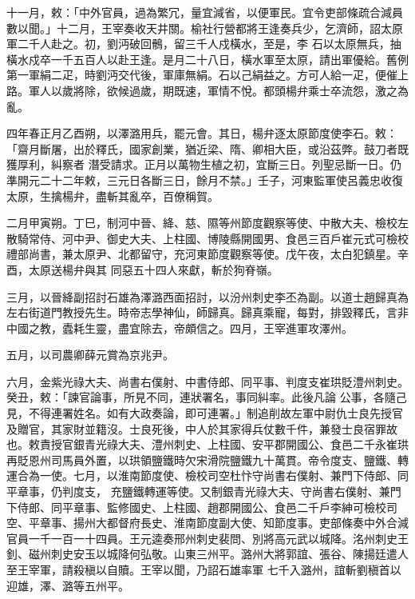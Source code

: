\begin{pinyinscope}
 十一月，敕：「中外官員，過為繁冗，量宜減省，以便軍民。宜令吏部條疏合減員數以聞。」十二月，王宰奏收天井關。榆社行營都將王逢奏兵少，乞濟師，詔太原軍二千人赴之。初，劉沔破回鶻，留三千人戍橫水，至是，李
 石以太原無兵，抽橫水戍卒一千五百人以赴王逢。是月二十八日，橫水軍至太原，請出軍優給。舊例第一軍絹二疋，時劉沔交代後，軍庫無絹。石以己絹益之。方可人給一疋，便催上路。軍人以歲將除，欲候過歲，期既速，軍情不悅。都頭楊弁乘士卒流怨，激之為亂。



 四年春正月乙酉朔，以澤潞用兵，罷元會。其日，楊弁逐太原節度使李石。敕：「齋月斷屠，出於釋氏，國家創業，猶近梁、隋、卿相大臣，或沿茲弊。鼓刀者既獲厚利，糾察者
 潛受請求。正月以萬物生植之初，宜斷三日。列聖忌斷一日。仍準開元二十二年敕，三元日各斷三日，餘月不禁。」壬子，河東監軍使呂義忠收復太原，生擒楊弁，盡斬其亂卒，百僚稱賀。



 二月甲寅朔。丁巳，制河中晉、絳、慈、隰等州節度觀察等使、中散大夫、檢校左散騎常侍、河中尹、御史大夫、上柱國、博陵縣開國男、食邑三百戶崔元式可檢校禮部尚書，兼太原尹、北都留守，充河東節度觀察等使。戊午夜，太白犯鎮星。辛酉，太原送楊弁與其
 同惡五十四人來獻，斬於狗脊嶺。



 三月，以晉絳副招討石雄為澤潞西面招討，以汾州刺史李丕為副。以道士趙歸真為左右街道門教授先生。時帝志學神仙，師歸真。歸真乘寵，每對，排毀釋氏，言非中國之教，蠹耗生靈，盡宜除去，帝頗信之。四月，王宰進軍攻澤州。



 五月，以司農卿薛元賞為京兆尹。



 六月，金紫光祿大夫、尚書右僕射、中書侍郎、同平事、判度支崔珙貶澧州刺史。癸丑，敕：「諫官論事，所見不同，連狀署名，事同糾率。此後凡論
 公事，各隨己見，不得連署姓名。如有大政奏論，即可連署。」制追削故左軍中尉仇士良先授官及贈官，其家財並籍沒。士良死後，中人於其家得兵仗數千件，兼發士良宿罪故也。敕責授官銀青光祿大夫、澧州刺史、上柱國、安平郡開國公、食邑二千永崔珙再貶恩州司馬員外置，以珙領鹽鐵時欠宋滑院鹽鐵九十萬貫。帝令度支、鹽鐵、轉運合為一使。七月，以淮南節度使、檢校司空杜忭守尚書右僕射、兼門下侍郎、同平章事，仍判度支，
 充鹽鐵轉運等使。又制銀青光祿大夫、守尚書右僕射、兼門下侍郎、同平章事、監修國史、上柱國、趙郡開國公、食邑二千戶李紳可檢校司空、平章事、揚州大都督府長史、淮南節度副大使、知節度事。吏部條奏中外合減官員一千一百一十四員。王元逵奏邢州刺史裴問、別將高元武以城降。洺州刺史王釗、磁州刺史安玉以城降何弘敬。山東三州平。潞州大將郭誼、張谷、陳揚廷遣人至王宰軍，請殺稹以自贖。王宰以聞，乃詔石雄率軍
 七千入潞州，誼斬劉稹首以迎雄，澤、潞等五州平。




\end{pinyinscope}
